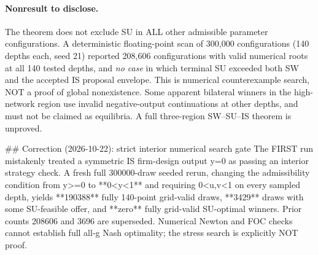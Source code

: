 \paragraph{Nonresult to disclose.}
The theorem does not exclude SU in ALL other admissible
parameter configurations. A deterministic floating-point
scan of 300{,}000 configurations (140 depths each, seed 21)
reported 208{,}606 configurations with valid numerical
roots at all 140 tested depths, and \emph{no case} in which
terminal SU exceeded both SW and the accepted IS
proposal envelope. This is numerical counterexample
search, NOT a proof of global nonexistence.
Some apparent bilateral winners in the high-network
region use invalid negative-output continuations at
other depths, and must not be claimed as equilibria.
A full three-region SW--SU--IS theorem is unproved.


## Correction (2026-10-22): strict interior numerical search gate
The FIRST run mistakenly treated a symmetric IS firm-design output y=0 as passing an interior strategy check. A fresh full 300000-draw seeded rerun, changing the admissibility condition from y>=0 to **0<y<1** and requiring 0<u,v<1 on every sampled depth, yields **190388** fully 140-point grid-valid draws, **3429** draws with some SU-feasible offer, and **zero** fully grid-valid SU-optimal winners. Prior counts 208606 and 3696 are superseded. Numerical Newton and FOC checks cannot establish full all-g Nash optimality; the stress search is explicitly NOT proof.

